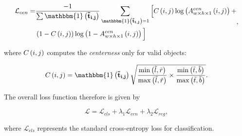\begin{equation}
    \begin{aligned}
        \label{eq:SiamCARCenLoss}
        \mathcal{L}_{cen} =
        &\frac{-1}{\sum \func{\mathbbm{1}}{\vect{\tilde{t}_{i, j}}}}
        \sum_{
            \func{\mathbbm{1}}{\vect{\tilde{t}_{i, j}}} = 1
        }
        \Big[
        \func{C}{i, j}
        \func{\log}{
            \func{\supsub{A}{w \times h \times 1}{cen}}{i, j}
        }
        +\\
        &\rbrackets{1 - \func{C}{i, j}}
        \func{\log}{
            1 - \func{\supsub{A}{w \times h \times 1}{cen}}{i, j}
        }
        \Big]
    \end{aligned},
\end{equation}

\noindent where ${C} \left( i, j \right)$ computes the \emph{centerness} only for valid objects:

\begin{equation}
    \label{eq:CenternesSiamCAR}
    \func{C}{i, j} =
    \func{\mathbbm{1}}{\vect{\tilde{t}_{i, j}}}
    \sqrt{
        \frac{
            \func{\min}{\tilde{l}, \tilde{r}}
        }{
            \func{\max}{\tilde{l}, \tilde{r}}
        }
        \times
        \frac{
            \func{\min}{\tilde{t}, \tilde{b}}
        }{
            \func{\max}{\tilde{t}, \tilde{b}}
        }
    }.
\end{equation}

\noindent The overall loss function therefore is given by

\begin{equation}
    \label{eq:SiamCAROverallLoss}
    \mathcal{L} =
    \mathcal{L}_{cls} +
    \lambda_1 \mathcal{L}_{cen} +
    \lambda_2 \mathcal{L}_{reg},
\end{equation}

\noindent where $\mathcal{L}_{cls}$ represents the standard cross-entropy loss for classification.
